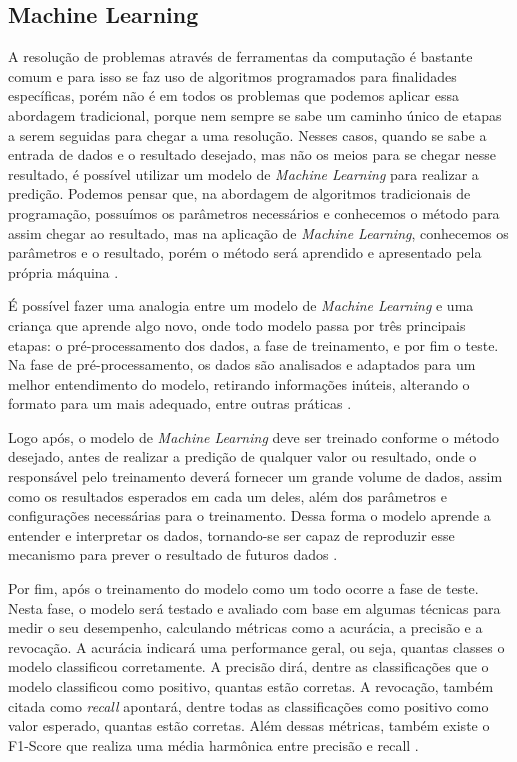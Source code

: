 \subsection{Machine Learning}

A resolução de problemas através de ferramentas da computação é bastante comum e para isso se faz uso de algoritmos programados para finalidades específicas, porém não é em todos os problemas que podemos aplicar essa abordagem tradicional, porque nem sempre se sabe um caminho único de etapas a serem seguidas para chegar a uma resolução. Nesses casos, quando se sabe a entrada de dados e o resultado desejado, mas não os meios para se chegar nesse resultado, é possível utilizar um modelo de \emph{Machine Learning} para realizar a predição. Podemos pensar que, na abordagem de algoritmos tradicionais de programação, possuímos os parâmetros necessários e conhecemos o método para assim chegar ao resultado, mas na aplicação de \emph{Machine Learning}, conhecemos os parâmetros e o resultado, porém o método será aprendido e apresentado pela própria máquina \cite{machineLearning}.

É possível fazer uma analogia entre um modelo de \emph{Machine Learning} e uma criança que aprende algo novo, onde todo modelo passa por três principais etapas: o pré-processamento dos dados, a fase de treinamento, e por fim o teste. Na fase de pré-processamento, os dados são analisados e adaptados para um melhor entendimento do modelo, retirando informações inúteis, alterando o formato para um mais adequado, entre outras práticas \cite{machineLearningPython}.

Logo após, o modelo de \emph{Machine Learning} deve ser treinado conforme o método desejado, antes de realizar a predição de qualquer valor ou resultado, onde o responsável pelo treinamento deverá fornecer um grande volume de dados, assim como os resultados esperados em cada um deles, além dos parâmetros e configurações necessárias para o treinamento. Dessa forma o modelo aprende a entender e interpretar os dados, tornando-se ser capaz de reproduzir esse mecanismo para prever o resultado de futuros dados \cite{machineLearningPython}.

Por fim, após o treinamento do modelo como um todo ocorre a fase de teste. Nesta fase, o modelo será testado e avaliado com base em algumas técnicas para medir o seu desempenho, calculando métricas como a acurácia, a precisão e a revocação. A acurácia indicará uma performance geral, ou seja, quantas classes o modelo classificou corretamente. A precisão dirá, dentre as classificações que o modelo classificou como positivo, quantas estão corretas. A revocação, também citada como \emph{recall} apontará, dentre todas as classificações como positivo como valor esperado, quantas estão corretas. Além dessas métricas, também existe o F1-Score que realiza uma média harmônica entre precisão e recall \cite{machineLearningTensorFlow}.

